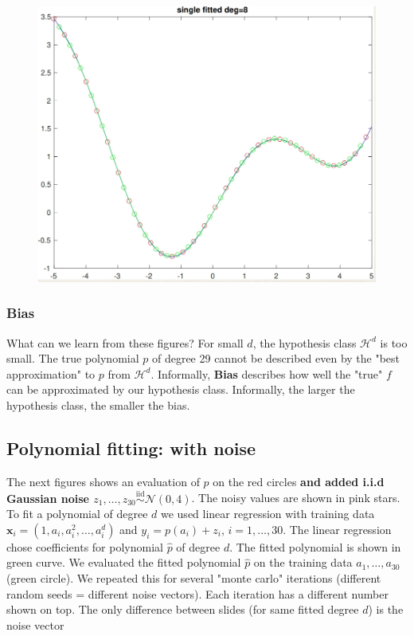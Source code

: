 \documentclass[11pt]{article}
\newcommand{\Nc}{\mathcal{N}}
\newcommand{\Hc}{\mathcal{H}}
\newcommand{\iid}{\stackrel{\text{iid}}{\sim}}
\begin{document}
\begin{figure}[h!]
\centering\includegraphics[scale=0.3]{clean_poly_d_8.png}
\end{figure}

\newpage

\subsubsection{Bias}
 What can we learn from these figures? For small $d$, the hypothesis class $\Hc^d$ is too small. The true polynomial $p$ of degree 29 cannot be described even by the "best approximation" to $p$
 from $\Hc^d$. Informally, {\bf Bias} describes how well the "true" $f$ can be approximated by our hypothesis class. Informally, the larger the hypothesis class, the smaller the bias.


\subsection{Polynomial fitting: with noise}
The next figures shows an evaluation of $p$ on the red  circles {\bf and added i.i.d Gaussian noise $z_1,\ldots,z_{30}\iid  \Nc(0,4)$}. The noisy values are shown in pink stars.
To fit a polynomial of degree $d$ we used linear regression with  training data $\mathbf{x}_i=(1,a_i,a_i^2,\ldots,a_i^d)$ and $y_i=p(a_i)+z_i$, $i=1,\ldots,30$.
The linear regression chose coefficients for polynomial $\hat{p}$ of degree $d$. The fitted polynomial is shown in green curve. We evaluated the fitted polynomial $\hat{p}$ on the training data $a_1,\ldots,a_{30}$ (green circle). We repeated this for several "monte carlo" iterations (different random seeds = different noise vectors). Each iteration has a different number shown on top. The only difference between slides (for same fitted degree $d$) is the noise vector
\end{document}
